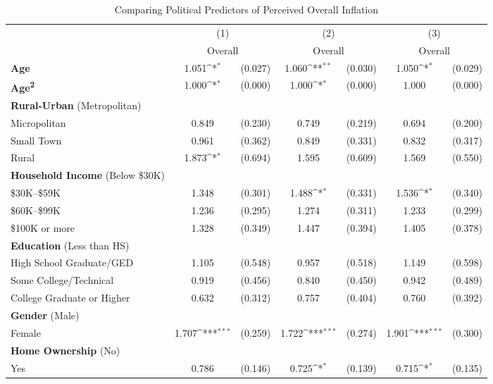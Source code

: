 \begin{table}[htbp]\centering \scriptsize
\label{tab:main}
\def\sym#1{\ifmmode^{#1}\else\(^{#1}\)\fi}
\caption{Comparing Political Predictors of Perceived Overall Inflation}
\begin{tabular}{l*{3}{cc}}
\hline\hline
                    &\multicolumn{2}{c}{(1)}           &\multicolumn{2}{c}{(2)}           &\multicolumn{2}{c}{(3)}           \\
                    &\multicolumn{2}{c}{Overall}       &\multicolumn{2}{c}{Overall}       &\multicolumn{2}{c}{Overall}       \\
\hline
\textbf{Age}        &       1.051\sym{*}  &     (0.027)&       1.060\sym{**} &     (0.030)&       1.050\sym{*}  &     (0.029)\\
\textbf{Age\textsuperscript{2}}&       1.000\sym{*}  &     (0.000)&       1.000\sym{*}  &     (0.000)&       1.000         &     (0.000)\\
\textbf{Rural-Urban} (Metropolitan) & & &  &  &     &  \\
Micropolitan        &       0.849         &     (0.230)&       0.749         &     (0.219)&       0.694         &     (0.200)\\
Small Town          &       0.961         &     (0.362)&       0.849         &     (0.331)&       0.832         &     (0.317)\\
Rural               &       1.873\sym{*}  &     (0.694)&       1.595         &     (0.609)&       1.569         &     (0.550)\\
\textbf{Household Income} (Below \$30K) & & &  &  &     &  \\
\$30K--\$59K        &       1.348         &     (0.301)&       1.488\sym{*}  &     (0.331)&       1.536\sym{*}  &     (0.340)\\
\$60K--\$99K        &       1.236         &     (0.295)&       1.274         &     (0.311)&       1.233         &     (0.299)\\
\$100K or more      &       1.328         &     (0.349)&       1.447         &     (0.394)&       1.405         &     (0.378)\\
\textbf{Education} (Less than HS) & & &  &  &     &  \\
High School Graduate/GED&       1.105         &     (0.548)&       0.957         &     (0.518)&       1.149         &     (0.598)\\
Some College/Technical&       0.919         &     (0.456)&       0.840         &     (0.450)&       0.942         &     (0.489)\\
College Graduate or Higher&       0.632         &     (0.312)&       0.757         &     (0.404)&       0.760         &     (0.392)\\
\textbf{Gender} (Male) & & &  &  &     &  \\
Female              &       1.707\sym{***}&     (0.259)&       1.722\sym{***}&     (0.274)&       1.901\sym{***}&     (0.300)\\
\textbf{Home Ownership} (No) & & &  &  &     &  \\
Yes                 &       0.786         &     (0.146)&       0.725\sym{*}  &     (0.139)&       0.715\sym{*}  &     (0.135)\\


\end{tabular}
\end{table}
